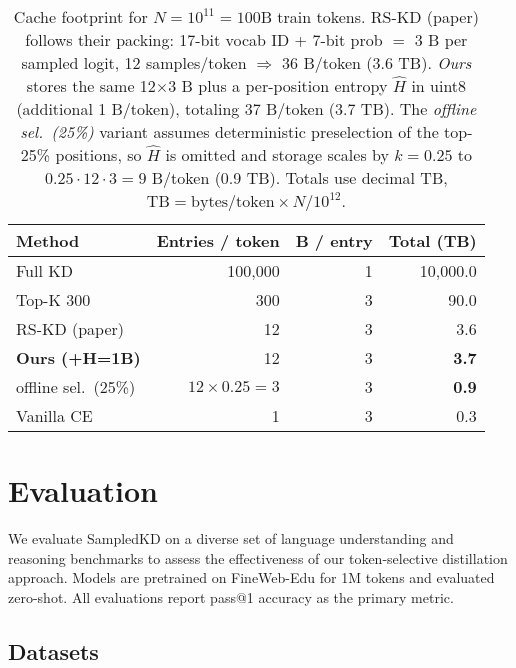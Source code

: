 \documentclass[11pt]{article}
\begin{document}
\begin{table}[h]
	\centering
	\begin{adjustbox}{max width=\linewidth}
		\begin{tabular}{lrrr}
			\toprule
			Method                    & Entries / token          & B / entry & Total (TB)   \\
			\midrule
			Full KD                   & 100{,}000                & 1         & 10{,}000.0   \\
			Top-K 300                 & 300                      & 3         & 90.0         \\
			RS-KD (paper)             & 12                       & 3         & 3.6          \\
			\textbf{Ours (+H=1B)}     & 12                       & 3         & \textbf{3.7} \\
			\quad offline sel.~(25\%) & $12 \!\times\! 0.25 = 3$ & 3         & \textbf{0.9} \\
			Vanilla CE                & 1                        & 3         & 0.3          \\
			\bottomrule
		\end{tabular}
	\end{adjustbox}
	\caption{Cache footprint for $N{=}10^{11}{=}100\text{B}$ train tokens. RS-KD (paper) follows their packing: 17-bit vocab ID + 7-bit prob $=$ 3 B per sampled logit, 12 samples/token $\Rightarrow$ 36 B/token (3.6 TB). \textit{Ours} stores the same 12$\times$3 B plus a per-position entropy $\hat H$ in uint8 (additional 1 B/token), totaling 37 B/token (3.7 TB). The \textit{offline sel.~(25\%)} variant assumes deterministic preselection of the top-25\% positions, so $\hat H$ is omitted and storage scales by $k{=}0.25$ to $0.25{\cdot}12{\cdot}3{=}9$ B/token (0.9 TB). Totals use decimal TB, $\mathrm{TB}=\text{bytes/token}\times N/10^{12}$.}
	\label{tab:storage}
\end{table}

\section{Evaluation}
\label{sec:evaluation}

We evaluate SampledKD on a diverse set of language understanding and reasoning benchmarks to assess the effectiveness of our token-selective distillation approach. Models are pretrained on FineWeb-Edu for 1M tokens and evaluated zero-shot. All evaluations report pass@1 accuracy as the primary metric.
\subsection{Datasets}
\end{document}

